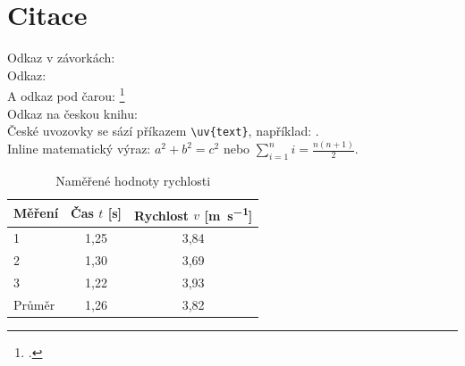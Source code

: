 
\section{Citace}
	Odkaz v závorkách: \parencite[viz][str. 900]{einstein}\\
	Odkaz: \cite{knuthwebsite}\\
	A odkaz pod čarou: \footcite[viz][str. 42]{latexcompanion}\\
	Odkaz na českou knihu: \cite{mareks}\\
	České uvozovky se sází příkazem \verb|\uv{text}|, například: .\\
	Inline matematický výraz: $a^2 + b^2 = c^2$ nebo $\sum_{i=1}^{n} i = \frac{n(n+1)}{2}$.
	
	\begin{table}[htbp]
		\centering
		\caption{Naměřené hodnoty rychlosti}
		\label{tab:mereni}
		\begin{tabular}{lcc}
			\toprule
			Měření & Čas $t$ [\si{\second}] & Rychlost $v$ [\si{\meter\per\second}] \\
			\midrule
			1 & 1{,}25 & 3{,}84 \\
			2 & 1{,}30 & 3{,}69 \\
			3 & 1{,}22 & 3{,}93 \\
			\midrule
			Průměr & 1{,}26 & 3{,}82 \\
			\bottomrule
		\end{tabular}
	\end{table}

\lipsum[2]
